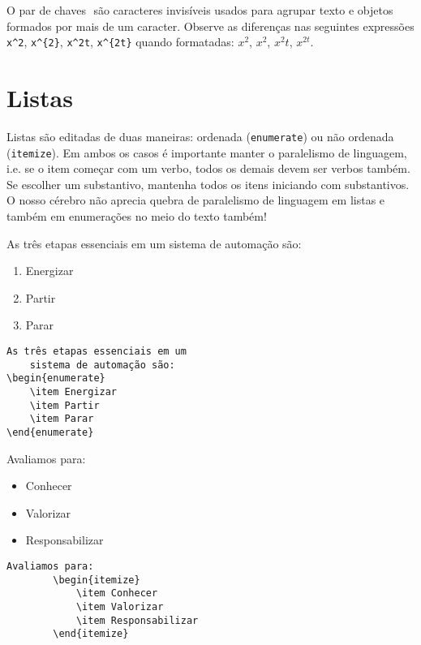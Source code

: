 O par de chaves $\qty{}$ são caracteres invisíveis usados para agrupar texto e objetos formados por mais de um caracter. Observe as diferenças nas seguintes expressões
 \verb|x^2|, \verb|x^{2}|, \verb|x^2t|, \verb|x^{2t}| quando formatadas: $x^2$, $x^{2}$, $x^2t$, $x^{2t}$.


\section{Listas}

Listas são editadas de duas maneiras: ordenada (\verb|enumerate|) ou não ordenada (\verb|itemize|). Em ambos os casos é importante manter o paralelismo de linguagem, i.e. se o item começar com um verbo, todos os demais devem ser verbos também. Se escolher um substantivo, mantenha todos os itens iniciando com substantivos. O nosso cérebro não aprecia quebra de paralelismo de linguagem em listas e também em enumerações no meio do texto também!

\begin{multicols}{2}
	As três etapas essenciais em um sistema de automação são:
		\begin{enumerate}
			\item Energizar
			\item Partir
			\item Parar
		\end{enumerate}
 \vfill\null 
\columnbreak
	\begin{lstlisting}[language={[Latex]Tex},frame=single]
	As três etapas essenciais em um 
	sistema de automação são:
\begin{enumerate}
	\item Energizar
	\item Partir
	\item Parar
\end{enumerate}
	\end{lstlisting}
\end{multicols}

\begin{multicols}{2}
Avaliamos para:
		\begin{itemize}
	\item Conhecer
	\item Valorizar
	\item Responsabilizar
\end{itemize}

  \columnbreak
	\begin{lstlisting}[language={[Latex]Tex},frame=single]
		Avaliamos para:
		\begin{itemize}
			\item Conhecer
			\item Valorizar
			\item Responsabilizar
		\end{itemize}
	\end{lstlisting}
\end{multicols}


